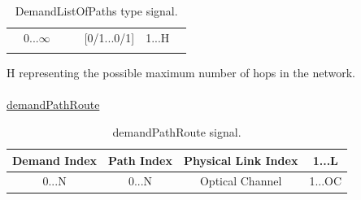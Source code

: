 \begin{table}[H]
\begin{tabular}{|lcccccl|}
		\multicolumn{1}{|l|}{} & \multicolumn{1}{c|}{0...$\infty$} & \multicolumn{1}{c|}{}                       & \multicolumn{1}{c|}{}                       & \multicolumn{1}{c|}{{[}0/1...0/1{]}} & \multicolumn{1}{c|}{1...H}                                                                                   &  \\ \cline{2-6}
		& \multicolumn{1}{l}{}              & \multicolumn{1}{l}{}                        & \multicolumn{1}{l}{}                        & \multicolumn{1}{l}{}                 & \multicolumn{1}{l}{}                                                                                         &  \\ \hline
	\end{tabular}
	\caption{DemandListOfPaths type signal.}
	\label{demandListOfPaths_example}
\end{table}

H representing the possible maximum number of hops in the network.\\
\\
\underline{demandPathRoute}\\
\begin{table}[H]
	\centering
	\begin{tabular}{|c|c|c|c|}
		\hline
		Demand Index           & Path Index             & Physical Link Index                       & 1...L                   \\ \hline
		\multirow{2}{*}{0...N} & \multirow{2}{*}{0...N} & \multirow{2}{*}{Optical Channel} & \multirow{2}{*}{1...OC} \\
		&                        &                                  &                          \\ \hline
	\end{tabular}
	\caption{demandPathRoute signal.}
	\label{demandPathRoute_signal}
\end{table}




